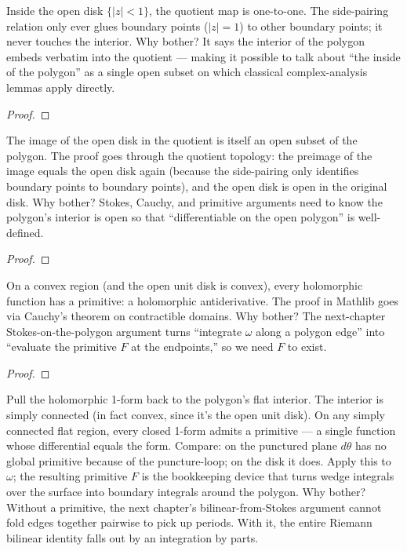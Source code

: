 \begin{layman}
Inside the open disk \(\{|z|<1\}\), the quotient map is one-to-one.
The side-pairing relation only ever glues boundary points
(\(|z|=1\)) to other boundary points; it never touches the interior.
Why bother? It says the interior of the polygon embeds verbatim
into the quotient --- making it possible to talk about ``the inside
of the polygon'' as a single open subset on which classical
complex-analysis lemmas apply directly.
\end{layman}


\begin{proof}\leanok\end{proof}

\begin{layman}
The image of the open disk in the quotient is itself an open subset
of the polygon. The proof goes through the quotient topology:
the preimage of the image equals the open disk again (because the
side-pairing only identifies boundary points to boundary points), and
the open disk is open in the original disk. Why bother? Stokes,
Cauchy, and primitive arguments need to know the polygon's
interior is open so that ``differentiable on the open polygon''
is well-defined.
\end{layman}


\begin{proof}\leanok\end{proof}

\begin{layman}
On a convex region (and the open unit disk is convex), every
holomorphic function has a primitive: a holomorphic antiderivative.
The proof in Mathlib goes via Cauchy's theorem on contractible
domains. Why bother? The next-chapter Stokes-on-the-polygon
argument turns ``integrate \(\omega\) along a polygon edge'' into
``evaluate the primitive \(F\) at the endpoints,'' so we need
\(F\) to exist.
\end{layman}


\begin{proof}\leanok\end{proof}

\begin{layman}
Pull the holomorphic 1-form back to the polygon's flat interior.
The interior is simply connected (in fact convex, since it's the
open unit disk). On any simply connected flat region, every
closed 1-form admits a primitive --- a single function whose
differential equals the form. Compare: on the punctured plane
\(d\theta\) has no global primitive because of the puncture-loop;
on the disk it does. Apply this to \(\omega\); the resulting
primitive \(F\) is the bookkeeping device that turns wedge
integrals over the surface into boundary integrals around the
polygon. Why bother? Without a primitive, the next chapter's
bilinear-from-Stokes argument cannot fold edges together pairwise
to pick up periods. With it, the entire Riemann bilinear
identity falls out by an integration by parts.
\end{layman}

